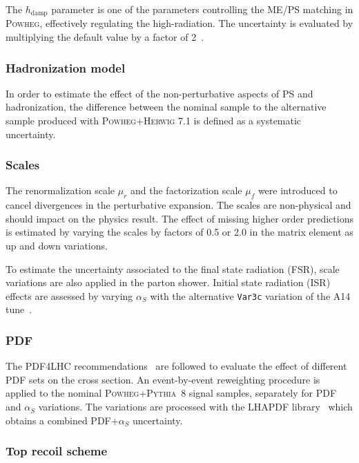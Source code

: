 The $h_\text{damp}$ parameter is one of the parameters controlling the ME/PS
matching in \textsc{Powheg}, effectively regulating the high-\pt radiation.
The uncertainty is evaluated by multiplying the default value
by a factor of 2~\cite{ATL-PHYS-PUB-2016-020}.

\subsubsection{Hadronization model}

In order to estimate the effect of the non-perturbative aspects of PS and 
hadronization, the difference between the nominal sample to the alternative sample produced with \textsc{Powheg+Herwig} 7.1 
is defined as a systematic uncertainty. 

\subsubsection{Scales}

The renormalization scale $\mu_r$ and the factorization scale $\mu_f$
were introduced to cancel divergences in the perturbative expansion.
The scales are non-physical and should impact on the physics result.
The effect of missing higher order predictions is estimated by varying the scales
by factors of 0.5 or 2.0 in the matrix element as up and down variations.

To estimate the uncertainty associated to the final state radiation (FSR),
scale variations are also applied in the parton shower.
Initial state radiation (ISR) effects are assessed by varying $\alpha_S$
with the alternative \verb|Var3c| variation of the A14 tune~\cite{ATL-PHYS-PUB-2017-007}. 

\subsubsection{PDF}

The PDF4LHC recommendations~\cite{Butterworth:2015oua} are followed to evaluate
the effect of different PDF sets on the cross section.
An event-by-event reweighting procedure is applied to the nominal \textsc{Powheg+Pythia}~8 signal samples,
separately for PDF and $\alpha_S$ variations.
The variations are processed with the LHAPDF library~\cite{Buckley:2014ana} 
which obtains a combined PDF+$\alpha_S$ uncertainty.

\subsubsection{Top recoil scheme}


